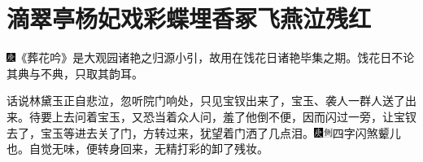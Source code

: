 

\chapter{滴翠亭杨妃戏彩蝶\hspace{.5em}埋香冢飞燕泣残红}

{\includegraphics[width=3mm]{../Images/00004}《葬花吟》是大观园诸艳之归源小引，故用在饯花日诸艳毕集之期。饯花日不论其典与不典，只取其韵耳。}

话说林黛玉正自悲泣，忽听院门响处，只见宝钗出来了，宝玉、袭人一群人送了出来。待要上去问着宝玉，又恐当着众人问，羞了他倒不便，因而闪过一旁，让宝钗去了，宝玉等进去关了门，方转过来，犹望着门洒了几点泪。{\includegraphics[width=3mm]{../Images/00004}\includegraphics[width=3mm]{../Images/00011}\footnotesize \kaishu 四字闪煞颦儿也。}自觉无味，便转身回来，无精打彩的卸了残妆。

